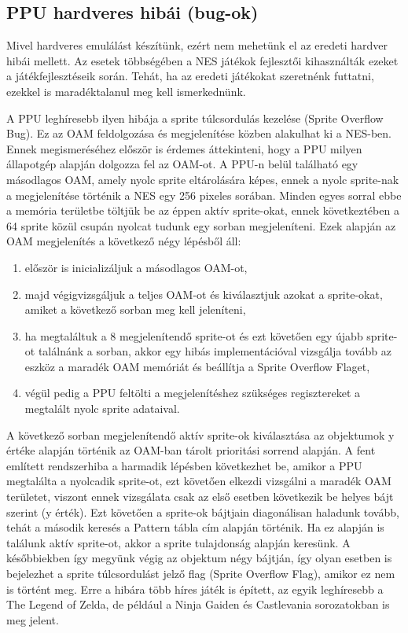  	 \subsection{PPU hardveres hibái (bug-ok)}
 	 Mivel hardveres emulálást készítünk, ezért nem mehetünk el az eredeti hardver hibái mellett. Az esetek többségében a NES játékok fejlesztői kihasználták ezeket a játékfejlesztéseik során. Tehát, ha az eredeti játékokat szeretnénk futtatni, ezekkel is maradéktalanul meg kell ismerkednünk.
 	 
 	 A PPU leghíresebb ilyen hibája a sprite túlcsordulás kezelése (Sprite Overflow Bug). Ez az OAM feldolgozása és megjelenítése közben alakulhat ki a NES-ben. Ennek megismeréséhez először is érdemes áttekinteni, hogy a PPU milyen állapotgép alapján dolgozza fel az OAM-ot. A PPU-n belül található egy másodlagos OAM, amely nyolc sprite eltárolására képes, ennek a nyolc sprite-nak a megjelenítése történik a NES egy 256 pixeles sorában. Minden egyes sorral ebbe a memória területbe töltjük be az éppen aktív sprite-okat, ennek következtében a 64 sprite közül csupán nyolcat tudunk egy sorban megjeleníteni. Ezek alapján az OAM megjelenítés a következő négy lépésből áll:
 	  
 	 \begin{enumerate}
 	 	\item először is inicializáljuk a másodlagos OAM-ot,
 	 	\item majd végigvizsgáljuk a teljes OAM-ot és kiválasztjuk azokat a sprite-okat, amiket a következő sorban meg kell jeleníteni,
 	 	\item ha megtaláltuk a 8 megjelenítendő sprite-ot és ezt követően egy újabb sprite-ot találnánk a sorban, akkor egy hibás implementációval vizsgálja tovább az eszköz a maradék OAM memóriát és beállítja a Sprite Overflow Flaget,
 	 	\item végül pedig a PPU feltölti a megjelenítéshez szükséges regisztereket a megtalált nyolc sprite adataival.
 	 \end{enumerate}
 	 
 	 A következő sorban megjelenítendő aktív sprite-ok kiválasztása az objektumok y értéke alapján történik az OAM-ban tárolt prioritási sorrend alapján. A fent említett rendszerhiba a harmadik lépésben következhet be, amikor a PPU megtalálta a nyolcadik sprite-ot, ezt követően elkezdi vizsgálni a maradék OAM területet, viszont ennek vizsgálata csak az első esetben következik be helyes bájt szerint (y érték). Ezt követően a sprite-ok bájtjain diagonálisan haladunk tovább, tehát a második keresés a Pattern tábla cím alapján történik. Ha ez alapján is találunk aktív sprite-ot, akkor a sprite tulajdonság alapján keresünk. A későbbiekben így megyünk végig az objektum négy bájtján, így olyan esetben is bejelezhet a sprite túlcsordulást jelző flag (Sprite Overflow Flag), amikor ez nem is történt meg. Erre a hibára több híres játék is épített, az egyik leghíresebb a The Legend of Zelda, de például a Ninja Gaiden és Castlevania sorozatokban is meg jelent.
 	 
